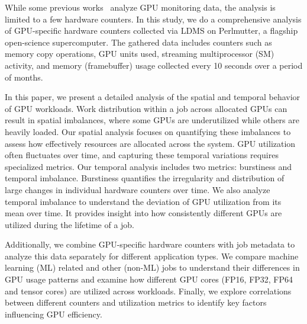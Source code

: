 While some previous works~\cite{chu2024generic, li2023analyzing, li2022ai}
analyze GPU monitoring data, the analysis is limited to a few hardware
counters.  In this study, we do a comprehensive analysis of GPU-specific
hardware counters collected via LDMS on Perlmutter, a flagship open-science
supercomputer.
The gathered data includes counters such as memory copy operations, GPU units
used, streaming multiprocessor (SM) activity, and memory (framebuffer) usage
collected every 10 seconds over a period of  months.

In this paper, we present a detailed analysis of the spatial and temporal
behavior of GPU workloads. Work distribution within a job across allocated GPUs
can result in spatial imbalances, where some GPUs are underutilized while
others are heavily loaded. Our spatial analysis focuses on quantifying these
imbalances to assess how effectively resources are allocated across the system.
GPU utilization often fluctuates over time, and capturing these temporal
variations requires specialized metrics.  Our temporal analysis includes two
metrics: burstiness and temporal imbalance.  Burstiness quantifies the
irregularity and distribution of large changes in individual hardware counters
over time.  We also analyze temporal imbalance to understand the deviation of
GPU utilization from its mean over time. It provides insight into how
consistently different GPUs are utilized during the lifetime of a job.

Additionally, we combine GPU-specific hardware counters with job metadata to
analyze this data separately for different application types. We compare machine
learning (ML) related and other (non-ML) jobs
to understand their differences in GPU usage patterns and examine how different
GPU cores (FP16, FP32, FP64 and tensor cores)  are utilized across workloads.
Finally, we explore correlations between different counters and utilization
metrics to identify key factors influencing GPU efficiency.


